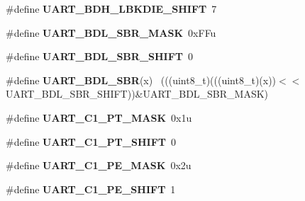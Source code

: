 \begin{DoxyCompactItemize}
\item 
\hypertarget{group___u_a_r_t___register___masks_gace1227bd2507a7c5df95398e097cb7af}{}\#define {\bfseries U\+A\+R\+T\+\_\+\+B\+D\+H\+\_\+\+L\+B\+K\+D\+I\+E\+\_\+\+S\+H\+I\+F\+T}~7\label{group___u_a_r_t___register___masks_gace1227bd2507a7c5df95398e097cb7af}

\item 
\hypertarget{group___u_a_r_t___register___masks_ga4471e77a5cfda8db1950aac0b204d964}{}\#define {\bfseries U\+A\+R\+T\+\_\+\+B\+D\+L\+\_\+\+S\+B\+R\+\_\+\+M\+A\+S\+K}~0x\+F\+Fu\label{group___u_a_r_t___register___masks_ga4471e77a5cfda8db1950aac0b204d964}

\item 
\hypertarget{group___u_a_r_t___register___masks_gad59af590652e14fd8d4a0d46ce48205a}{}\#define {\bfseries U\+A\+R\+T\+\_\+\+B\+D\+L\+\_\+\+S\+B\+R\+\_\+\+S\+H\+I\+F\+T}~0\label{group___u_a_r_t___register___masks_gad59af590652e14fd8d4a0d46ce48205a}

\item 
\hypertarget{group___u_a_r_t___register___masks_ga9a4c1b71fc2de587237f1381f0f69d75}{}\#define {\bfseries U\+A\+R\+T\+\_\+\+B\+D\+L\+\_\+\+S\+B\+R}(x)                                                ~(((uint8\+\_\+t)(((uint8\+\_\+t)(x))$<$$<$U\+A\+R\+T\+\_\+\+B\+D\+L\+\_\+\+S\+B\+R\+\_\+\+S\+H\+I\+F\+T))\&U\+A\+R\+T\+\_\+\+B\+D\+L\+\_\+\+S\+B\+R\+\_\+\+M\+A\+S\+K)\label{group___u_a_r_t___register___masks_ga9a4c1b71fc2de587237f1381f0f69d75}

\item 
\hypertarget{group___u_a_r_t___register___masks_ga5a1c05b549b94de9232fbac665b3f584}{}\#define {\bfseries U\+A\+R\+T\+\_\+\+C1\+\_\+\+P\+T\+\_\+\+M\+A\+S\+K}~0x1u\label{group___u_a_r_t___register___masks_ga5a1c05b549b94de9232fbac665b3f584}

\item 
\hypertarget{group___u_a_r_t___register___masks_ga1638e7faa5063dab6afd34353fde4c89}{}\#define {\bfseries U\+A\+R\+T\+\_\+\+C1\+\_\+\+P\+T\+\_\+\+S\+H\+I\+F\+T}~0\label{group___u_a_r_t___register___masks_ga1638e7faa5063dab6afd34353fde4c89}

\item 
\hypertarget{group___u_a_r_t___register___masks_ga0204f696872c2e5f92413bb11d0170d1}{}\#define {\bfseries U\+A\+R\+T\+\_\+\+C1\+\_\+\+P\+E\+\_\+\+M\+A\+S\+K}~0x2u\label{group___u_a_r_t___register___masks_ga0204f696872c2e5f92413bb11d0170d1}

\item 
\hypertarget{group___u_a_r_t___register___masks_ga1113f7bea6e6612fcc04db049d41cd1e}{}\#define {\bfseries U\+A\+R\+T\+\_\+\+C1\+\_\+\+P\+E\+\_\+\+S\+H\+I\+F\+T}~1\label{group___u_a_r_t___register___masks_ga1113f7bea6e6612fcc04db049d41cd1e}


\end{DoxyCompactItemize}
